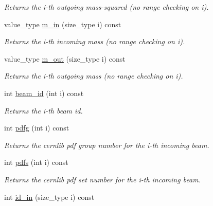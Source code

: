\begin{DoxyCompactItemize}
\begin{DoxyCompactList}\small\item\em Returns the i-\/th outgoing mass-\/squared (no range checking on i). \end{DoxyCompactList}\item 
\hypertarget{a00212_aa09103ecc4bbb6bd92ce3f7c383c21ee}{}value\+\_\+type \hyperlink{a00212_aa09103ecc4bbb6bd92ce3f7c383c21ee}{m\+\_\+in} (size\+\_\+type i) const \label{a00212_aa09103ecc4bbb6bd92ce3f7c383c21ee}

\begin{DoxyCompactList}\small\item\em Returns the i-\/th incoming mass (no range checking on i). \end{DoxyCompactList}\item 
\hypertarget{a00212_a840b7af8f27e9f671ef7661e23a10204}{}value\+\_\+type \hyperlink{a00212_a840b7af8f27e9f671ef7661e23a10204}{m\+\_\+out} (size\+\_\+type i) const \label{a00212_a840b7af8f27e9f671ef7661e23a10204}

\begin{DoxyCompactList}\small\item\em Returns the i-\/th outgoing mass (no range checking on i). \end{DoxyCompactList}\item 
\hypertarget{a00212_a69d39c68698b14c8fd5abfd162b8f8ef}{}int \hyperlink{a00212_a69d39c68698b14c8fd5abfd162b8f8ef}{beam\+\_\+id} (int i) const \label{a00212_a69d39c68698b14c8fd5abfd162b8f8ef}

\begin{DoxyCompactList}\small\item\em Returns the i-\/th beam id. \end{DoxyCompactList}\item 
\hypertarget{a00212_ac24c26a9e3c14c3b650f077a595c571b}{}int \hyperlink{a00212_ac24c26a9e3c14c3b650f077a595c571b}{pdfg} (int i) const \label{a00212_ac24c26a9e3c14c3b650f077a595c571b}

\begin{DoxyCompactList}\small\item\em Returns the cernlib pdf group number for the i-\/th incoming beam. \end{DoxyCompactList}\item 
\hypertarget{a00212_a2ca5e23a439422f77d49981a09072dee}{}int \hyperlink{a00212_a2ca5e23a439422f77d49981a09072dee}{pdfs} (int i) const \label{a00212_a2ca5e23a439422f77d49981a09072dee}

\begin{DoxyCompactList}\small\item\em Returns the cernlib pdf set number for the i-\/th incoming beam. \end{DoxyCompactList}\item 
\hypertarget{a00212_ad7eb70375dff438f73ebc5f79919279a}{}int \hyperlink{a00212_ad7eb70375dff438f73ebc5f79919279a}{id\+\_\+in} (size\+\_\+type i) const \label{a00212_ad7eb70375dff438f73ebc5f79919279a}


\end{DoxyCompactItemize}
